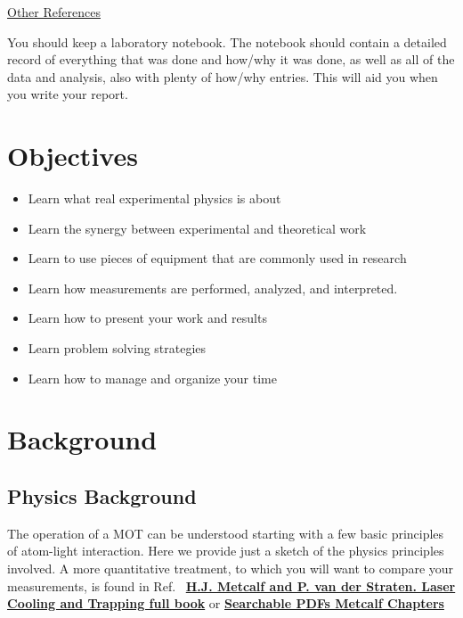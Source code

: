 \documentclass{../lab}
\begin{document}
\hyperref[sec:References]{Other References}

You should keep a laboratory notebook. The notebook should contain a detailed record of everything that was done and how/why it was done, as well as all of the data and analysis, also with plenty of how/why entries. This will aid you when you write your report.

\section{Objectives}

\begin{itemize}
    \item Learn what real experimental physics is about

    \item Learn the synergy between experimental and theoretical work

    \item Learn to use pieces of equipment that are commonly used in research

    \item Learn how measurements are performed, analyzed, and interpreted.

    \item Learn how to present your work and results

    \item Learn problem solving strategies

    \item Learn how to manage and organize your time
\end{itemize}

\section{Background}

\subsection{Physics Background}

The operation of a MOT can be understood starting with a few basic principles of atom-light interaction. Here we provide just a sketch of the physics principles involved. A more quantitative treatment, to which you will want to compare your measurements, is found in Ref.~\cite{Metcalf} \href{http://books.google.com/books?id=hDJPnSFh-g0C&dq=H.J.+Metcalf+and+P.+van+der+Straeten.+Laser+Cooling+and+Trapping+book&printsec=frontcover&source=bn&hl=en&ei=jMWaS4eRD4TuswPgytidAg&sa=X&oi=book\_result&ct=result&resnum=4&ved=0CBAQ6AEwAw#v=onepage&q=&f=false}{\textbf{H.J. Metcalf and P. van der Straten. Laser Cooling and Trapping full book}} or \href{http://physics111.lib.berkeley.edu/Physics111/Reprints/MOT/Laser\_Cooling\_and\_Trapping\_HJ\_Metcalf/}{\textbf{Searchable PDFs Metcalf Chapters}}
\end{document}
